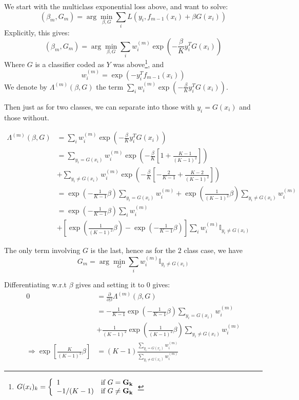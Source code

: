 We start with the multiclass exponential loss above, and want to solve:
$$(\beta_m, G_m) = \arg\min_{\beta, G} \sum_i  L(y_i, f_{m-1}(x_i) + \beta G(x_i))$$
Explicitly, this gives:
$$ (\beta_m, G_m) = \arg\min_{\beta, G} \sum_i w_i^{(m)} \exp\left( -\frac{\beta}{K} y_i^T G(x_i) \right)$$
Where $G$ is a classifier coded as $Y$ was above\footnote{$G(x_i)_k = \left\{ \begin{array}{ll} 1 & \mbox{if } G= \mathbf{G_k} \\ -1/(K-1) & \mbox{if }  G \neq \mathbf{G_k} \end{array} \right.$}, and
$$w_i^{(m)} = \exp\left(-y_i^T f_{m-1}(x_i)\right)$$
We denote by $\Lambda^{(m)}(\beta, G)$ the term $\sum_i w_i^{(m)} \exp\left( -\frac{\beta}{K} y_i^T G(x_i) \right)$.

Then just as for two classes, we can separate into those with $y_i = G(x_i)$ and those without.

\begin{align*}
    \Lambda^{(m)}(\beta, G) &= \sum_i w_i^{(m)} \exp\left( -\frac{\beta}{K} y_i^T G(x_i) \right) \\
     &= \sum_{y_i = G(x_i)} w_i^{(m)} \exp\left( -\frac{\beta}{K} \left[1 + \frac{K-1}{(K-1)^2}\right] \right) \\
     &+ \sum_{y_i \neq G(x_i)} w_i^{(m)} \exp\left( -\frac{\beta}{K} \left[-\frac{2}{K-1} + \frac{K-2}{(K-1)^2}\right] \right) \\
     &= \exp\left( -\frac{1}{K-1}\beta \right) \sum_{y_i = G(x_i)} w_i^{(m)}  + \exp\left( \frac{1}{(K-1)^2} \beta \right)  \sum_{y_i \neq G(x_i)} w_i^{(m)} \\
     &= \exp\left( -\frac{1}{K-1}\beta \right) \sum_{i} w_i^{(m)}  \\
     &+ \left[\exp\left( \frac{1}{(K-1)^2} \beta \right) - \exp\left( -\frac{1}{K-1}\beta \right)\right]  \sum_{i} w_i^{(m)} \mathbb{I}_{y_i \neq G(x_i)} 
\end{align*}

The only term involving $G$ is the last, hence as for the $2$ class case, we have
$$ G_m = \arg\min_G \sum_{i} w_i^{(m)} \mathbb{I}_{y_i \neq G(x_i)} $$

Differentiating w.r.t $\beta$ gives and setting it to $0$ gives:
\begin{align*}
    0 &=\frac{\partial}{\partial \beta} \Lambda^{(m)}(\beta, G) \\
     &= -\frac{1}{K-1} \exp\left( -\frac{1}{K-1}\beta \right) \sum_{y_i = G(x_i)} w_i^{(m)}  \\
     &+ \frac{1}{(K-1)^2}  \exp\left( \frac{1}{(K-1)^2} \beta \right) \sum_{y_i \neq G(x_i)} w_i^{(m)} \\
     \Rightarrow \exp\left[\frac{K}{(K-1)^2} \beta \right] &= (K-1)\frac{\sum_{y_i = G(x_i)} w_i^{(m)}}{\sum_{y_i \neq G(x_i)} w_i^{(m)}} 
\end{align*}

